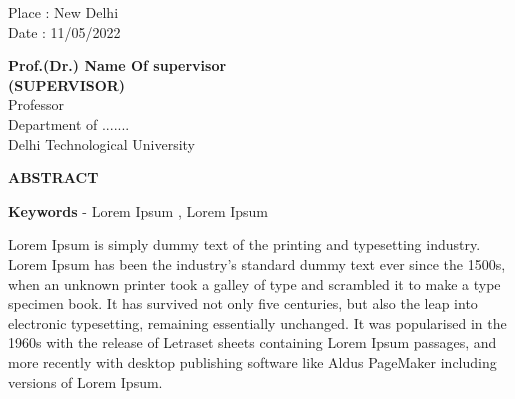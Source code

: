 \documentclass[12pt,a4paper]{report}
\begin{document}
\noindent \begin{minipage}{4cm}
\begin{flushleft}
\vspace{1 cm}
                         
Place : New Delhi \\
Date : 11/05/2022 \\

\end{flushleft} 
\end{minipage}
\hfill
\begin{minipage}{10cm}
\begin{flushright}                                      
\vspace{2cm}
                         

\vspace{.8cm}
\textbf{Prof.(Dr.) Name Of supervisor}\\
\textbf{(SUPERVISOR)}\\
Professor\\
Department of ....... \\
Delhi Technological University\\
\end{flushright} 
\end{minipage}

\newpage


\begin{center}
 \textbf{ABSTRACT}
\end{center}

\textbf{Keywords} - Lorem Ipsum , Lorem Ipsum 

\vspace{0.8cm}

Lorem Ipsum is simply dummy text of the printing and typesetting industry. Lorem Ipsum has been the industry's standard dummy text ever since the 1500s, when an unknown printer took a galley of type and scrambled it to make a type specimen book. It has survived not only five centuries, but also the leap into electronic typesetting, remaining essentially unchanged. It was popularised in the 1960s with the release of Letraset sheets containing Lorem Ipsum passages, and more recently with desktop publishing software like Aldus PageMaker including versions of Lorem Ipsum.
\end{document}
